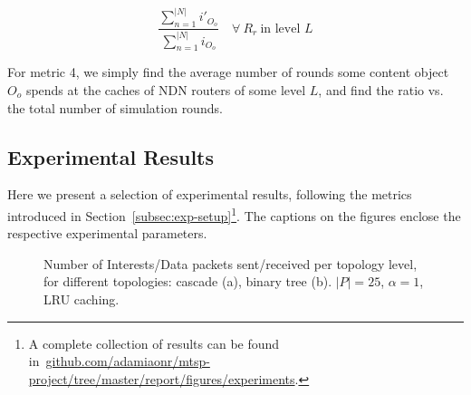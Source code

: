 \begin{equation}
    \frac{\sum_{n=1}^{|N|} i'_{O_o}}{\sum_{n=1}^{|N|} i_{O_o}} \quad \forall \ R_r \ \text{in level $L$}
    \label{eq:exp-setup-metrics-2}
\end{equation}\shortvertbreak

For metric 4, we simply find the average number of rounds 
some content object $O_o$ spends at the caches of NDN routers of some level $L$, and find 
the ratio vs. the total number of simulation rounds.

\subsection{Experimental Results}
\label{subsec:exp-results}

Here we present a selection of experimental results, following the metrics 
introduced in Section~\ref{subsec:exp-setup}\footnote{A complete collection of 
results can be found in~\url{github.com/adamiaonr/mtsp-project/tree/master/report/figures/experiments}.}. 
The captions on the figures enclose the respective experimental parameters.\shortvertbreak


\begin{figure}[h!]
    \centering


    \cprotect\caption{Number of Interests\slash Data packets sent\slash received 
        per topology level, for different topologies: cascade (a), binary tree (b). 
        $|P| = 25$, $\alpha = 1$, LRU caching.}
    \label{fig:exp-results-topologies}

\end{figure}

